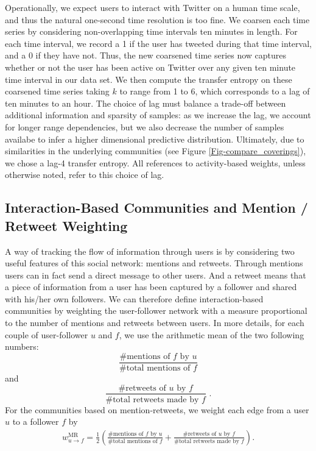 Operationally, we expect users to interact with Twitter on a human time scale, and thus the natural one-second time resolution is too fine. We coarsen each time series by considering non-overlapping time intervals ten minutes in length. For each time interval, we record a 1 if the user has tweeted during that time interval, and a 0 if they have not. Thus, the new coarsened time series now captures whether or not the user has been active on Twitter over any given ten minute time interval in our data set. We then compute the transfer entropy on these coarsened time series taking $k$ to range from 1 to 6, which corresponds to a lag of ten minutes to an hour. The choice of lag must balance a trade-off between additional information and sparsity of samples: as we increase the lag, we account for longer range dependencies, but we also decrease the number of samples availabe to infer a higher dimensional predictive distribution. Ultimately, due to similarities in the underlying communities (see Figure \ref{Fig-compare_coverings}), we chose a lag-4 transfer entropy. All references to activity-based weights, unless otherwise noted, refer to this choice of lag.

\subsection{Interaction-Based Communities and Mention / Retweet Weighting}
\label{sec:method-interaction}

A way of tracking the flow of information through users is by considering two useful features of this social network: mentions and retweets. Through mentions users can in fact send a direct message to other users. And a retweet means that a piece of information from a user has been captured by a follower and shared with his/her own followers. We can therefore define interaction-based communities by weighting the user-follower network with a measure proportional to the number of mentions and retweets between users. In more details, for each couple of user-follower $u$ and $f$, we use the arithmetic mean of the two following numbers:
\begin{equation}
\frac{\mbox{\# mentions of }f \mbox{ by }u}{\mbox{\# total mentions of }f}
\end{equation}
and
\begin{equation}
\frac{\mbox{\# retweets of }u \mbox{ by }f}{\mbox{\# total retweets made by }f} \mbox{ .}
\end{equation}
For the communities based on mention-retweets, we weight each edge from a user $u$ to a follower $f$ by 
\begin{align}
	w_{u \to f}^{\text{MR}} = \frac{1}{2}\left(\frac{\mbox{\# mentions of }f \mbox{ by }u}{\mbox{\# total mentions of }f} + \frac{\mbox{\# retweets of }u \mbox{ by }f}{\mbox{\# total retweets made by }f}\right).
\end{align} 


